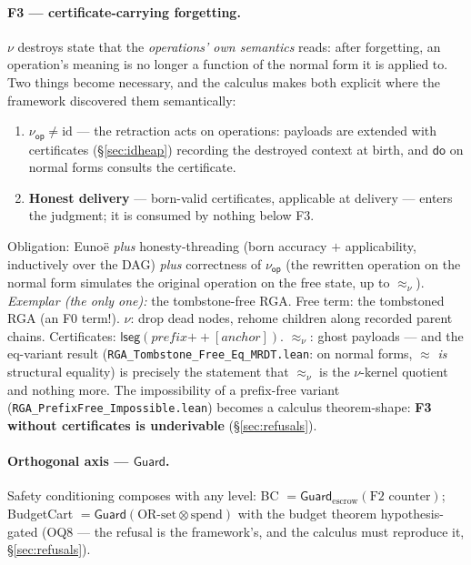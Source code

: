 \documentclass[11pt]{article}
\newcommand{\lean}[1]{\texttt{#1}}
\newcommand{\dodo}{\mathsf{do}}
\newcommand{\eqobs}{\approx}
\newcommand{\Guard}{\mathsf{Guard}}
\newcommand{\lseg}{\mathsf{lseg}}
\newcommand{\nuop}{\nu_{\mathsf{op}}}
\begin{document}
\paragraph{F3 --- certificate-carrying forgetting.} $\nu$ destroys state
that the \emph{operations' own semantics} reads: after forgetting, an
operation's meaning is no longer a function of the normal form it is
applied to. Two things become necessary, and the calculus makes both
explicit where the framework discovered them semantically:
\begin{enumerate}[leftmargin=2em]
\item \textbf{$\nuop \neq \mathrm{id}$} --- the retraction acts on
  operations: payloads are extended with certificates
  (\S\ref{sec:idheap}) recording the destroyed context at birth, and
  $\dodo$ on normal forms consults the certificate.
\item \textbf{Honest delivery} --- born-valid certificates, applicable at
  delivery --- enters the judgment; it is consumed by nothing below F3.
\end{enumerate}
Obligation: Euno\"e \emph{plus} honesty-threading (born accuracy $+$
applicability, inductively over the DAG) \emph{plus} correctness of
$\nuop$ (the rewritten operation on the normal form simulates the original
operation on the free state, up to $\eqobs_\nu$). \emph{Exemplar (the only
one):} the tombstone-free RGA. Free term: the tombstoned RGA (an F0
term!). $\nu$: drop dead nodes, rehome children along recorded parent
chains. Certificates:
$\lseg(\mathit{prefix} \mathbin{+\!\!+} [\mathit{anchor}])$.
$\eqobs_\nu$: ghost payloads --- and the eq-variant result
(\lean{RGA\_Tombstone\_Free\_Eq\_MRDT.lean}: on normal forms, $\eqobs$
\emph{is} structural equality) is precisely the statement that
$\eqobs_\nu$ is the $\nu$-kernel quotient and nothing more. The
impossibility of a prefix-free variant
(\lean{RGA\_PrefixFree\_Impossible.lean}) becomes a calculus theorem-shape:
\textbf{F3 without certificates is underivable} (\S\ref{sec:refusals}).

\paragraph{Orthogonal axis --- $\Guard$.} Safety conditioning composes
with any level: BC $= \Guard_{\text{escrow}}(\text{F2 counter})$;
BudgetCart $= \Guard(\text{OR-set} \otimes \text{spend})$ with the
budget theorem hypothesis-gated (OQ8 --- the refusal is the framework's,
and the calculus must reproduce it, \S\ref{sec:refusals}).
\end{document}

